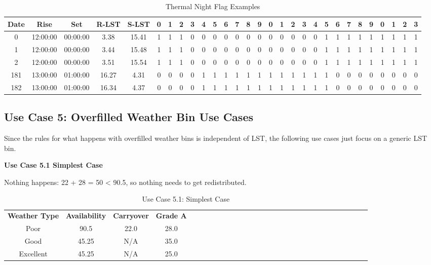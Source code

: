 \documentclass{article}
\begin{document}
\begin{table}
{\tiny
\caption{Thermal Night Flag Examples \label{tab:time}}
\begin{tabular*}{1.05\textwidth}{@{\extracolsep{\fill}}ccccccccccccccccccccccccccccc}

\hline \hline
{\bf Date} & {\bf Rise} & {\bf Set} & {\bf R-LST} & {\bf S-LST} & {\bf 0} & {\bf 1} & {\bf 2} & {\bf 3} & {\bf 4} & {\bf 5} & {\bf 6} & {\bf 7} & {\bf 8} & {\bf 9} & {\bf 0} & {\bf 1} & {\bf 2} & {\bf 3} & {\bf 4} & {\bf 5} & {\bf 6} & {\bf 7} & {\bf 8} & {\bf 9} & {\bf 0} & {\bf 1} & {\bf 2} & {\bf 3}\\
\hline
0 & 12:00:00 & 00:00:00 & 3.38 & 15.41 & 1 & 1 & 1 & 0 & 0 & 0 & 0 & 0 & 0 & 0 & 0 & 0 & 0 & 0 & 0 & 1 & 1 & 1 & 1 & 1 & 1 & 1 & 1 & 1\\
1 & 12:00:00 & 00:00:00 & 3.44 & 15.48 & 1 & 1 & 1 & 0 & 0 & 0 & 0 & 0 & 0 & 0 & 0 & 0 & 0 & 0 & 0 & 1 & 1 & 1 & 1 & 1 & 1 & 1 & 1 & 1\\
2 & 12:00:00 & 00:00:00 & 3.51 & 15.54 & 1 & 1 & 1 & 0 & 0 & 0 & 0 & 0 & 0 & 0 & 0 & 0 & 0 & 0 & 0 & 1 & 1 & 1 & 1 & 1 & 1 & 1 & 1 & 1\\
181 & 13:00:00 & 01:00:00 & 16.27 & 4.31 & 0 & 0 & 0 & 0 & 1 & 1 & 1 & 1 & 1 & 1 & 1 & 1 & 1 & 1 & 1 & 1 & 0 & 0 & 0 & 0 & 0 & 0 & 0 & 0\\
182 & 13:00:00 & 01:00:00 & 16.34 & 4.37 & 0 & 0 & 0 & 0 & 1 & 1 & 1 & 1 & 1 & 1 & 1 & 1 & 1 & 1 & 1 & 1 & 0 & 0 & 0 & 0 & 0 & 0 & 0 & 0\\
\hline \hline
\end{tabular*}
}
\end{table}

\subsection{Use Case 5: Overfilled Weather Bin Use Cases}

Since the rules for what happens with overfilled weather bins is independent of LST, the following use cases just focus on a generic LST bin.

{\bf Use Case 5.1 Simplest Case}

Nothing happens: 
22 + 28 = 50 < 90.5, so nothing needs to get redistributed.

\begin{table}
{\footnotesize
\caption{Use Case 5.1: Simplest Case \label{tab:time}}
\begin{tabular*}{1.05\textwidth}{@{\extracolsep{\fill}}ccccccccccccccccccccccccccccc}

\hline \hline
{\bf Weather Type} & {\bf Availability} & {\bf Carryover} & {\bf Grade A}\\
Poor & 90.5 & 22.0 & 28.0\\
Good & 45.25 & N/A & 35.0\\
Excellent & 45.25 & N/A & 25.0\\
\hline \hline
\end{tabular*}
}
\end{table}
\end{document}
